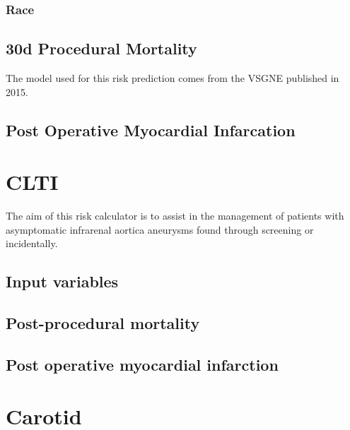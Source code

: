 \documentclass[
]{book}
\begin{document}
\hypertarget{race}{%
\subsection{Race}\label{race}}

\hypertarget{d-procedural-mortality}{%
\section{30d Procedural Mortality}\label{d-procedural-mortality}}

The model used for this risk prediction comes from the VSGNE published in 2015. \citet{eslami2015}

\hypertarget{post-operative-myocardial-infarcation}{%
\section{Post Operative Myocardial Infarcation}\label{post-operative-myocardial-infarcation}}

\hypertarget{clti}{%
\chapter{CLTI}\label{clti}}

The aim of this risk calculator is to assist in the management of patients with asymptomatic infrarenal aortica aneurysms found through screening or incidentally.

\hypertarget{input-variables-1}{%
\section{Input variables}\label{input-variables-1}}

\hypertarget{post-procedural-mortality}{%
\section{Post-procedural mortality}\label{post-procedural-mortality}}

\hypertarget{post-operative-myocardial-infarction}{%
\section{Post operative myocardial infarction}\label{post-operative-myocardial-infarction}}

\hypertarget{carotid}{%
\chapter{Carotid}\label{carotid}}
\end{document}
